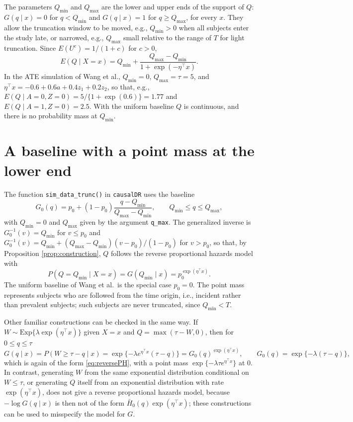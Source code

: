 \documentclass[11pt]{article}
\newcommand{\Qmin}{Q_{\min}}
\newcommand{\Qmax}{Q_{\max}}
\begin{document}
The parameters $\Qmin$ and $\Qmax$ are the lower and upper ends of the support of $Q$:
$G(q \mid x) = 0$ for $q < \Qmin$ and $G(q \mid x) = 1$ for $q \ge \Qmax$, for every $x$.
They allow the truncation window to be moved, e.g., $\Qmin > 0$ when all subjects enter the
study late, or narrowed, e.g., $\Qmax$ small relative to the range of $T$ for light
truncation. Since $E(U^c) = 1/(1 + c)$ for $c > 0$,
\begin{equation*}
E(Q \mid X = x) = \Qmin + \frac{\Qmax - \Qmin}{1 + \exp(-\eta^\top x)}.
\end{equation*}
In the ATE simulation of Wang et al., $\Qmin = 0$, $\Qmax = \tau = 5$, and
$\eta^\top x = -0.6 + 0.6a + 0.4z_1 + 0.2z_2$, so that, e.g.,
$E(Q \mid A = 0, Z = 0) = 5/\{1 + \exp(0.6)\} = 1.77$ and $E(Q \mid A = 1, Z = 0) = 2.5$.
With the uniform baseline $Q$ is continuous, and there is no probability mass at $\Qmin$.

\section{A baseline with a point mass at the lower end}

The function \texttt{sim\_data\_trunc()} in \texttt{causalDR} uses the baseline
\begin{equation*}
G_0(q) = p_0 + (1 - p_0)\frac{q - \Qmin}{\Qmax - \Qmin}, \qquad \Qmin \le q \le \Qmax,
\end{equation*}
with $\Qmin = 0$ and $\Qmax$ given by the argument \texttt{q\_max}. The generalized inverse
is $G_0^{-1}(v) = \Qmin$ for $v \le p_0$ and
$G_0^{-1}(v) = \Qmin + (\Qmax - \Qmin)(v - p_0)/(1 - p_0)$ for $v > p_0$, so that, by
Proposition \ref{prop:construction}, $Q$ follows the reverse proportional hazards model
with
\begin{equation*}
P(Q = \Qmin \mid X = x) = G(\Qmin \mid x) = p_0^{\exp(\eta^\top x)}.
\end{equation*}
The uniform baseline of Wang et al.\ is the special case $p_0 = 0$. The point mass
represents subjects who are followed from the time origin, i.e., incident rather than
prevalent subjects; such subjects are never truncated, since $\Qmin < T$.

Other familiar constructions can be checked in the same way. If
$W \sim \mathrm{Exp}\{\lambda\exp(\eta^\top x)\}$ given $X = x$ and
$Q = \max(\tau - W, 0)$, then for $0 \le q \le \tau$
\begin{equation*}
G(q \mid x) = P(W \ge \tau - q \mid x) = \exp\{-\lambda e^{\eta^\top x}(\tau - q)\}
= G_0(q)^{\exp(\eta^\top x)}, \qquad G_0(q) = \exp\{-\lambda(\tau - q)\},
\end{equation*}
which is again of the form \eqref{eq:reversePH}, with a point mass
$\exp\{-\lambda\tau e^{\eta^\top x}\}$ at 0. In contrast, generating $W$ from the same
exponential distribution conditional on $W \le \tau$, or generating $Q$ itself from an
exponential distribution with rate $\exp(\eta^\top x)$, does not give a reverse
proportional hazards model, because
$-\log G(q \mid x)$ is then not of the form $\bar H_0(q)\exp(\eta^\top x)$; these
constructions can be used to misspecify the model for $G$.
\end{document}
